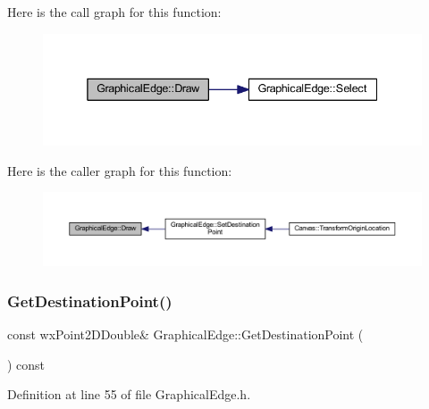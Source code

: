 Here is the call graph for this function\+:
\nopagebreak
\begin{figure}[H]
\begin{center}
\leavevmode
\includegraphics[width=338pt]{class_graphical_edge_a48170a7fc9e86d92985d694addca8837_cgraph}
\end{center}
\end{figure}
Here is the caller graph for this function\+:
\nopagebreak
\begin{figure}[H]
\begin{center}
\leavevmode
\includegraphics[width=350pt]{class_graphical_edge_a48170a7fc9e86d92985d694addca8837_icgraph}
\end{center}
\end{figure}
\mbox{\label{class_graphical_edge_aaf19f4b4688b5eb5df39be7af1d09b4b}} 
\subsubsection{\texorpdfstring{Get\+Destination\+Point()}{GetDestinationPoint()}}
{\footnotesize\ttfamily const wx\+Point2\+D\+Double\& Graphical\+Edge\+::\+Get\+Destination\+Point (\begin{DoxyParamCaption}{ }\end{DoxyParamCaption}) const\hspace{0.3cm}{\ttfamily [inline]}}



Definition at line 55 of file Graphical\+Edge.\+h.

\mbox{\label{class_graphical_edge_af8738fa9de63d51bec94fae3bebbe4ac}} 
